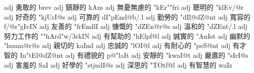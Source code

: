 %
%

\newpage
\begin{tegzk}%
            {adj}   {勇敢的}        {}{brev}            {}{}
             {adj}   {鎮靜的}        {}{kAm}             {}{}
         {adj}   {無憂無慮的}    {}{"kEr""fri}       {}{}
           {adj}   {聰明的}        {}{"klEv{/@r}}      {}{}
          {adj}   {好奇的}        {}{"kjUrI@s}{}{}
       {adj}   {可靠的}        {}{dI"pEnd@b{/.l}}  {}{}
         {adj}   {勤勞的}        {}{"dIl@dZ@nt}      {}{}
        {adj}   {寬容的}        {}{f{/@r}"gIvIN}    {}{}
         {adj}   {友善的}        {}{"frEndlI}        {}{}
         {adj}   {慷慨的}        {}{"dZEn@r@s}       {}{}
           {adj}   {溫和的}        {}{"dZEnt{/.l}}     {}{}
     {adj}   {努力工作的}    {}{""hArd"w{/3r}kIN}{}{}
          {adj}   {有幫助的}      {}{"hElpf@l}        {}{}
           {adj}   {誠實的}        {}{"AnIst}  {}{}
         {adj}   {幽默的}        {}{"huum@r@s}       {}{}
             {adj}   {親切的}        {}{kaInd}           {}{}
            {adj}   {忠誠的}        {}{"lOI@l}          {}{}
          {adj}   {有耐心的}      {}{"peS@nt}         {}{}
      {adj}   {有才智的}      {}{In"tEl@dZ@nt}    {}{}
           {adj}   {有禮貌的}      {}{p@"laIt}         {}{}
            {adj}   {安靜的}        {}{"kwaI@t}         {}{}
          {adj}   {嚴肅的}        {}{"sIrI@s}         {}{}
              {adj}   {害羞的}        {}{SaI}             {}{}
         {adj}   {好學的}        {}{"stjudI@s}       {}{}
       {adj}   {深思的}        {}{"TOtf@l}         {}{}
             {adj}   {有智慧的}      {}{waIz}            {}{}
\end{tegzk}


